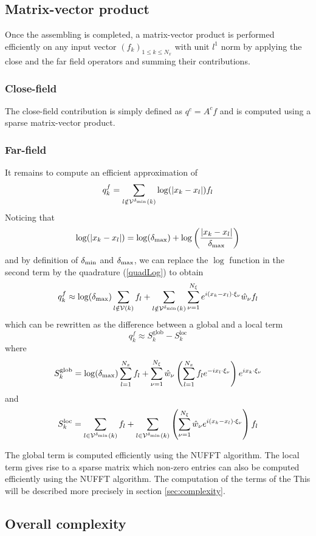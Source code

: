 \documentclass[11pt,a4paper]{article}
\begin{document}
\subsection{Matrix-vector product}

Once the assembling is completed, a matrix-vector product is performed efficiently on any input vector $(f_k)_{1 \leq k \leq N_x}$ with unit $l^1$ norm by applying the close and the far field operators and summing their contributions. 

\subsubsection*{Close-field}
The close-field contribution is simply defined as $q^c = A^c f$ and is computed using a sparse matrix-vector product. 

\subsubsection*{Far-field}
It remains to compute an efficient approximation of 
\[q_k^{f} = \sum_{l \notin \mathcal{V}^{\delta_{\min}}(k)} \log(|x_k - x_l|)f_l\]
Noticing that 
\[\log(|x_k - x_l|) = \log(\delta_{\max}) + \log\left(\dfrac{|x_k - x_l|}{\delta_{\max}}\right)\]
and by definition of $\delta_{\min}$ and $\delta_{\max}$, we can replace the $\log$ function in the second term by the quadrature (\ref{quadLog}) to obtain 
\[ q_k^{f} \approx \log(\delta_{\max}) \sum_{l\notin \mathcal{V}(k)}f_l +  \sum_{l\notin \mathcal{V}^{\delta_{\min}}(k)} \sum_{\nu=1}^{N_{\xi}} e^{i (x_k-x_l) \cdot \xi_\nu}\hat{w}_{\nu}f_l\]
which can be rewritten as the difference between a global and a local term 
\[ q_k^{f} \approx S^{\text{glob}}_k - S^{\text{loc}}_k\]
where 
\[S^{\text{glob}}_k = \log(\delta_{\max})\sum_{l=1}^{N_x}f_l +  \sum_{\nu = 1}^{N_\xi}\hat{w}_{\nu} \left(\sum_{l=1}^{N_x} f_l e^{- i x_l \cdot \xi_\nu} \right) e^{i x_k\cdot \xi_\nu} \]
and
\[S^{\text{loc}}_k = \sum_{l\in \mathcal{V}^{\delta_{\min}}(k)}f_l +  \sum_{l\in \mathcal{V}^{\delta_{\min}}(k)}\left( \sum_{\nu=1}^{N_{\xi}} \hat{w}_{\nu} e^{i (x_k-x_l) \cdot \xi_\nu} \right)f_l \]

The global term is computed efficiently using the NUFFT algorithm. The local term gives rise to a sparse matrix which non-zero entries can also be computed efficiently using the NUFFT algorithm. The computation of the terms of the  This will be described more precisely in section \ref{sec:complexity}. 

\subsection{Overall complexity}
\end{document}
